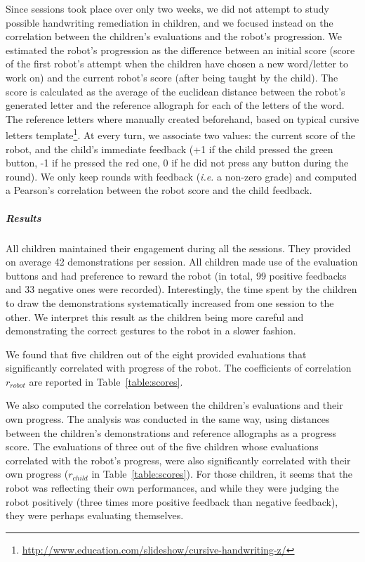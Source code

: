 \documentclass[10pt,a4paper]{article}
\newcommand{\ie}{\textit{i.e.}\xspace}
\begin{document}
Since sessions took place over only two weeks, we did not attempt to study possible
handwriting remediation in children, and we focused instead on the correlation between the children's evaluations and the robot's progression.
We estimated the robot's progression as the difference between an initial score
(score of the first robot's attempt when the children have chosen a new word/letter to
work on) and the current robot's score (after being taught by the child). The
score is calculated as the average of the euclidean
distance between the robot's generated letter and the reference allograph for each of the letters of the
word. The reference letters where manually created beforehand, based on typical cursive letters template\footnote{\url{http://www.education.com/slideshow/cursive-handwriting-z/}}. At every turn, we associate two values: the current score of the robot, and the child's immediate feedback (+1 if the child pressed the green button, -1 if he pressed the red one, 0 if he did not press any button during the round). We only keep rounds with feedback (\ie a non-zero grade) and computed a Pearson's correlation between the robot score and the child feedback.
\subparagraph{Results}
All children maintained their engagement during all the sessions. They provided
on average 42 demonstrations per session. All children made use of the evaluation buttons and
had preference to reward the robot (in total, 99 positive feedbacks and 33 negative ones were recorded). Interestingly, the time spent by the children to draw the demonstrations systematically increased from one session to the other. We interpret this result as the children being more careful and demonstrating the correct gestures to the robot in a slower fashion.

We found that five children out of the eight provided evaluations that significantly correlated with progress of the robot. The coefficients of correlation $r_{robot}$ are reported in Table~\ref{table:scores}.

We also computed the correlation between the children's evaluations and their own
progress. The analysis was conducted in the same way, using distances between the children's demonstrations and reference allographs as a progress score.
The evaluations of three out of the five children whose evaluations correlated with the robot's progress, were also significantly correlated with their own progress ($r_{child}$ in Table~\ref{table:scores}). For
those children, it seems that the robot was reflecting their own performances, and while they
were judging the robot positively (three times more positive feedback than negative feedback),
they were perhaps evaluating themselves.
\end{document}
